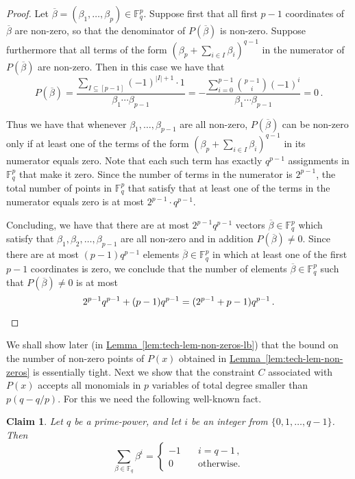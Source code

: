 \documentclass[10pt]{article}
\newtheorem{claim}[theorem]{Claim}
\theoremstyle{definition}
\numberwithin{equation}{section}
\newcommand{\expref}[2]{\texorpdfstring{\hyperref[#2]{#1~\ref{#2}}}{#1~\ref{#2}}}
\newcommand{\F}{{\mathbb{F}}}
\begin{document}
\begin{proof}
Let $\overline \beta= (\beta_1,\ldots,\beta_p) \in \F_q^p$. Suppose first that all first $p-1$ coordinates of $\overline \beta$ are non-zero, so that the denominator of $P(\overline \beta)$ is non-zero. Suppose furthermore that all terms of the form $(\beta_p + \sum_{i \in I} \beta_i)^{q-1}$ in the numerator of $P(\overline \beta)$ are non-zero. Then in this case we have that
\[P(\overline \beta) = \frac {\sum_{ I \subseteq [p-1]} (-1)^{|I|+1} \cdot 1 } {\beta_1 \cdots \beta_{p-1}} =  -\frac {\sum_{i=0}^{p-1} \binom {p-1} {i} (-1)^{i} } {\beta_1 \cdots \beta_{p-1}}  = 0 \,.\]

Thus we have that whenever $\beta_1,\ldots,\beta_{p-1}$ are all non-zero, $P(\overline \beta)$ can be non-zero only if at least one of the terms of the form $(\beta_p + \sum_{i \in I} \beta_i)^{q-1}$ in its numerator equals zero. Note that each such term has exactly $q^{p-1}$ assignments in $\F_q^p$ that make it zero. Since the number of terms in the numerator is $2^{p-1}$,
the total number of points in $\F_q^p$ that satisfy that at least one of the terms in the numerator equals zero is at most
$2^{p-1}\cdot  q^{p-1}$.

Concluding, we have that there are at most $2^{p-1} q^{p-1}$ vectors $\overline \beta \in \F_q^p$ which satisfy that $\beta_1,\beta_2,\ldots,\beta_{p-1}$ are all non-zero and in addition $P(\overline \beta) \neq 0$. Since there are at most
$(p-1)q^{p-1}$ elements $\overline \beta \in \F_q^p$ in which at least one of the first $p-1$ coordinates is zero, we conclude that the number of elements $\overline \beta \in \F_q^p$ such that $P(\overline \beta) \neq 0$ is at most \[2^{p-1} q^{p-1} + (p-1)q^{p-1} =
(2^{p-1}+p-1)q^{p-1}\,.\qedhere\] 
\end{proof}

We shall show later (in \expref{Lemma}{lem:tech-lem-non-zeros-lb}) that the bound on the number of non-zero points of $P(x)$ obtained in \expref{Lemma}{lem:tech-lem-non-zeros} is essentially tight.
Next we show that the constraint $C$ associated with  $P(x)$ accepts all monomials in $p$ variables of total degree smaller than $p(q-q/p)$.
For this we need the following well-known fact.

\begin{claim}\label{claim:power-sum}
Let $q$ be a prime-power, and let $i$ be an integer 
%
from
$\{0,1,\ldots,q-1\}$. Then
\[\sum_{\beta \in \F_q} \beta^i = \begin{cases}
  -1 & \quad i = q-1\,, \\
  0 & \quad \text{otherwise.}
\end{cases}
 \]
\end{claim}
\end{document}
